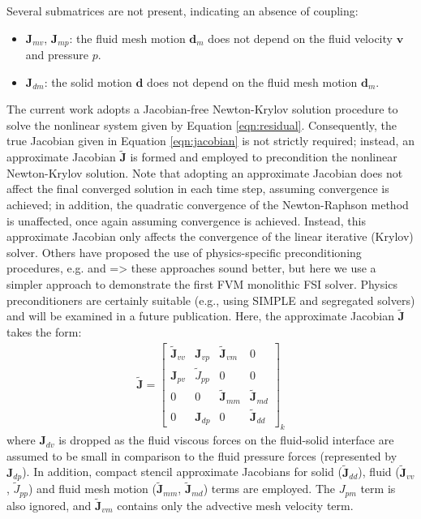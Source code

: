 \documentclass[sn-mathphys,Numbered]{sn-jnl}%
\newcommand{\bb}{\boldsymbol}
\begin{document}
Several submatrices are not present, indicating an absence of coupling:
\begin{itemize}
	\item $\bb{J}_{mv}$, $\bb{J}_{mp}$: the fluid mesh motion $\bb{d}_m$ does not depend on the fluid velocity $\bb{v}$ and pressure $p$.
	\item $\bb{J}_{dm}$: the solid motion $\bb{d}$ does not depend on the fluid mesh motion $\bb{d}_m$. 
\end{itemize}

The current work adopts a Jacobian-free Newton-Krylov solution procedure \citep{Cardiff2025JFNK} to solve the nonlinear system given by Equation \ref{eqn:residual}.
Consequently, the true Jacobian given in Equation \ref{eqn:jacobian} is not strictly required; instead, an approximate Jacobian $\tilde{\bb{J}}$ is formed and employed to precondition the nonlinear Newton-Krylov solution.
Note that adopting an approximate Jacobian does not affect the final converged solution in each time step, assuming convergence is achieved; in addition, the quadratic convergence of the Newton-Raphson method is unaffected, once again assuming convergence is achieved.
Instead, this approximate Jacobian only affects the convergence of the linear iterative (Krylov) solver.
Others have proposed the use of physics-specific preconditioning procedures, e.g. \citet{Gee20??_Wall} and \citet{Heil2008} => these approaches sound better, but here we use a simpler approach to demonstrate the first FVM monolithic FSI solver.
Physics preconditioners are certainly suitable (e.g., using SIMPLE and segregated solvers) and will be examined in a future publication.
Here, the approximate Jacobian $\tilde{\bb{J}}$ takes the form:
\begin{eqnarray} \label{eqn:approx_jacobian}
\tilde{\bb{J}} =
\begin{bmatrix}
\tilde{\bb{J}}_{vv} & \bb{J}_{vp} & \tilde{\bb{J}}_{vm} & 0 \\
\bb{J}_{pv} & \tilde{J}_{pp} & 0 & 0 \\
0 & 0 & \tilde{\bb{J}}_{mm} & \tilde{\bb{J}}_{md} \\
0 & \bb{J}_{dp} & 0 & \tilde{\bb{J}}_{dd}
\end{bmatrix}_k
\end{eqnarray}
where $\bb{J}_{dv}$ is dropped as the fluid viscous forces on the fluid-solid interface are assumed to be small in comparison to the fluid pressure forces (represented by $\bb{J}_{dp}$).
In addition, compact stencil approximate Jacobians for solid ($\tilde{\bb{J}}_{dd}$), fluid ($\tilde{\bb{J}}_{vv}$, $\tilde{J}_{pp}$) and fluid mesh motion ($\tilde{\bb{J}}_{mm}$, $\tilde{\bb{J}}_{md}$) terms are employed.
The $J_{pm}$ term is also ignored, and $\tilde{\bb{J}}_{vm}$ contains only the advective mesh velocity term.
\end{document}
